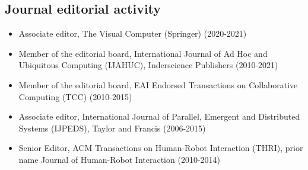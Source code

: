 \subsection*{Journal editorial activity}
    
\begin{itemize}

\item Associate editor, The Visual Computer (Springer) (2020-2021)

\item Member of the editorial board, International Journal of Ad Hoc and Ubiquitous Computing (IJAHUC), Inderscience Publishers (2010-2021)

\item Member of the editorial board, EAI Endorsed Transactions on Collaborative Computing (TCC) (2010-2015)

\item Associate editor, International Journal of Parallel, Emergent and
Distributed Systems (IJPEDS), Taylor and Francis (2006-2015)

\item Senior Editor, ACM Transactions on Human-Robot Interaction (THRI), prior name Journal of Human-Robot Interaction (2010-2014)

\end{itemize}
